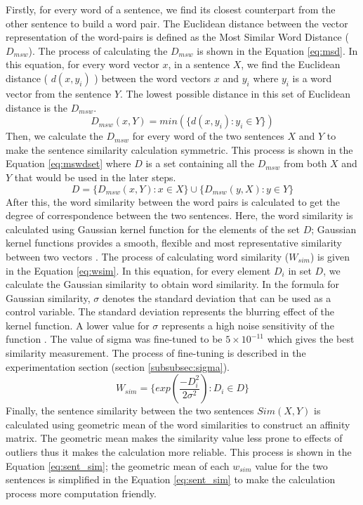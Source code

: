 \documentclass[acmlarge]{acmart}
\begin{document}
Firstly, for every word of a sentence, we find its closest counterpart from the other sentence to build a word pair. The Euclidean distance between the vector representation of the word-pairs is defined as the Most Similar Word Distance ($D_{msw}$). The process of calculating the $D_{msw}$ is shown in the Equation \ref{eq:msd}. In this equation, for every word vector $x$, in a sentence $X$, we find the Euclidean distance ( $d(x,y_i)$ ) between the word vectors $x$ and $y_i$ where $y_i$ is a word vector from the sentence $Y$. The lowest possible distance in this set of Euclidean distance is the $D_{msw}$. 
\begin{equation}\label{eq:msd}
	D_{msw}(x,Y) = min(\{d(x,y_i) : y_i \in Y \})
\end{equation}
Then, we calculate the $D_{msw}$ for every word of the two sentences $X$ and $Y$ to make the sentence similarity calculation symmetric. This process is shown in the Equation \ref{eq:mswdset} where $D$ is a set containing all the $D_{msw}$ from both $X$ and $Y$ that would be used in the later steps.
\begin{equation}
	D = \{D_{msw}(x,Y) : x \in X\} \cup \{D_{msw}(y,X) : y \in Y\}
	\label{eq:mswdset}
\end{equation}
After this, the word similarity between the word pairs is calculated to get the degree of correspondence between the two sentences. Here, the word similarity is calculated using Gaussian kernel function for the elements of the set $D$; Gaussian kernel functions provides a smooth, flexible and most representative similarity between two vectors \cite{babud-1986-gaussian}. The process of calculating word similarity ($W_{sim}$) is given in the Equation \ref{eq:wsim}. In this equation, for every element $D_i$ in set $D$, we calculate the Gaussian similarity to obtain word similarity. In the formula for Gaussian similarity, $\sigma$ denotes the standard deviation that can be used as a control variable. The standard deviation represents the blurring effect of the kernel function. A lower value for $\sigma$ represents a high noise sensitivity of the function \cite{babud-1986-gaussian}. The value of sigma was fine-tuned to be $5\times10^{-11}$ which gives the best similarity measurement. The process of fine-tuning is described in the experimentation section (section \ref{subsubsec:sigma}). 
\begin{equation}\label{eq:wsim}
	W_{sim} = \{ exp\left(\frac{-D_i^2}{2\sigma^2}\right) : D_i \in D\}
\end{equation}
Finally, the sentence similarity between the two sentences $Sim(X,Y)$ is calculated using geometric mean of the word similarities to construct an affinity matrix. The geometric mean makes the similarity value less prone to effects of outliers thus it makes the calculation more reliable. This process is shown in the Equation \ref{eq:sent_sim}; the geometric mean of each $w_{sim}$ value for the two sentences is simplified in the Equation \ref{eq:sent_sim} to make the calculation process more computation friendly. 
\end{document}
